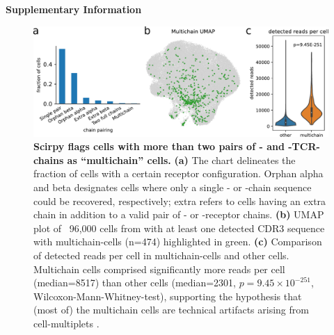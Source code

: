 \documentclass{article}
\begin{document}
\begin{center}
    \normalfont\Large\bfseries{Supplementary Information}
\end{center}
\vspace*{60pt}

\begin{figure}[!hb]
  \centering
  \includegraphics[width=7in]{../figures/multichains.pdf}
  \caption{
    \textbf{Scirpy flags cells with more than two pairs of \textalpha- and \textbeta-TCR-chains as “multichain” cells.} 
    \textbf{(a)} The chart delineates the fraction of
    cells with a certain receptor configuration. Orphan alpha and beta designates cells 
    where only a single \textalpha- or \textbeta-chain sequence could be recovered, 
    respectively; extra refers to cells having an extra chain in addition to a valid pair of
    \textalpha- or \textbeta-receptor chains. 
    \textbf{(b)} UMAP plot of ~96,000 cells from \textcite{Wu2020-vp} with at
    least one detected CDR3 sequence with multichain-cells (n=474) highlighted in green.
    \textbf{(c)} Comparison of detected reads per cell in multichain-cells and other cells.
    Multichain cells comprised significantly more reads per cell (median=8517) than other cells (median=2301, $p=9.45 \times 10^{-251}$, Wilcoxon-Mann-Whitney-test), supporting the hypothesis 
    that (most of) the multichain cells are technical artifacts arising from 
    cell-multiplets \cite{Ilicic2016-ny}. }
\end{figure}
\end{document}
